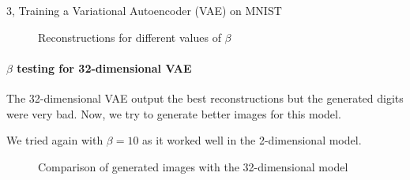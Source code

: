 \begin{task}{3, Training a Variational Autoencoder (VAE) on MNIST}
\begin{figure}[H]
    \centering
    \caption{Reconstructions for different values of \(\beta\)}
    \label{recbeta2d}
\end{figure}

\paragraph{\(\beta\) testing for 32-dimensional VAE} The 32-dimensional VAE output the best reconstructions but the generated digits were very bad. Now, we try to generate better images for this model.

We tried again with \(\beta = 10\) as it worked well in the 2-dimensional model.
\begin{figure}[H]
    \centering
    \caption{Comparison of generated images with the 32-dimensional model}
    \label{generated32beta}
\end{figure}


\end{task}
